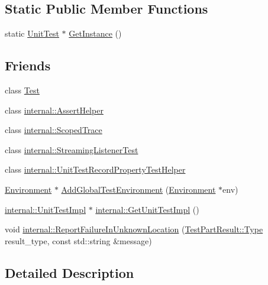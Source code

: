 \subsection*{Static Public Member Functions}
\begin{DoxyCompactItemize}
\item 
static \hyperlink{classtesting_1_1_unit_test}{Unit\+Test} $\ast$ \hyperlink{classtesting_1_1_unit_test_a24192400b70b3b946746954e9574fb8e}{Get\+Instance} ()
\end{DoxyCompactItemize}
\subsection*{Friends}
\begin{DoxyCompactItemize}
\item 
class \hyperlink{classtesting_1_1_unit_test_a5b78b1c2e1fa07ffed92da365593eaa4}{Test}
\item 
class \hyperlink{classtesting_1_1_unit_test_a183151aa061362c87572e743fe233db1}{internal\+::\+Assert\+Helper}
\item 
class \hyperlink{classtesting_1_1_unit_test_afa3927576c08d7b1e197ba16b2b3dcb7}{internal\+::\+Scoped\+Trace}
\item 
class \hyperlink{classtesting_1_1_unit_test_adc037d188dab349a94868991955c9cd4}{internal\+::\+Streaming\+Listener\+Test}
\item 
class \hyperlink{classtesting_1_1_unit_test_ae970f89a9f477a349fe5778be85ef42e}{internal\+::\+Unit\+Test\+Record\+Property\+Test\+Helper}
\item 
\hyperlink{classtesting_1_1_environment}{Environment} $\ast$ \hyperlink{classtesting_1_1_unit_test_a5ec26e4c31220ff8e769cc09689a4d6d}{Add\+Global\+Test\+Environment} (\hyperlink{classtesting_1_1_environment}{Environment} $\ast$env)
\item 
\hyperlink{classtesting_1_1internal_1_1_unit_test_impl}{internal\+::\+Unit\+Test\+Impl} $\ast$ \hyperlink{classtesting_1_1_unit_test_a56e56be7066957d612e53b5c60f6ac08}{internal\+::\+Get\+Unit\+Test\+Impl} ()
\item 
void \hyperlink{classtesting_1_1_unit_test_a73f5a158c13793b90c80d854c9a75120}{internal\+::\+Report\+Failure\+In\+Unknown\+Location} (\hyperlink{classtesting_1_1_test_part_result_a65ae656b33fdfdfffaf34858778a52d5}{Test\+Part\+Result\+::\+Type} result\+\_\+type, const std\+::string \&message)
\end{DoxyCompactItemize}


\subsection{Detailed Description}


